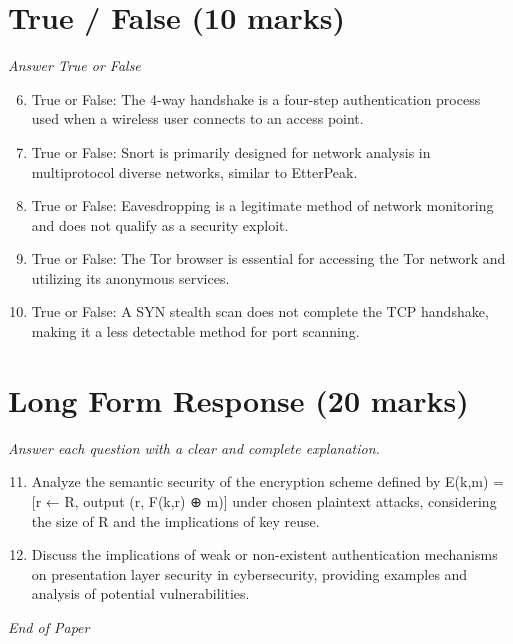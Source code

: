 \documentclass[12pt]{article}
\begin{document}
\section*{True / False (10 marks)}
\textit{Answer True or False}
\begin{enumerate}[label=\arabic*.]
\setcounter{enumi}{5}
\item True or False: The 4-way handshake is a four-step authentication process used when a wireless user connects to an access point.
\item True or False: Snort is primarily designed for network analysis in multiprotocol diverse networks, similar to EtterPeak.
\item True or False: Eavesdropping is a legitimate method of network monitoring and does not qualify as a security exploit.
\item True or False: The Tor browser is essential for accessing the Tor network and utilizing its anonymous services.
\item True or False: A SYN stealth scan does not complete the TCP handshake, making it a less detectable method for port scanning.
\end{enumerate}

\section*{Long Form Response (20 marks)}
\textit{Answer each question with a clear and complete explanation.}
\begin{enumerate}[label=\arabic*.]
\setcounter{enumi}{10}
\item Analyze the semantic security of the encryption scheme defined by E(k,m) = [r ← R, output (r, F(k,r) ⊕ m)] under chosen plaintext attacks, considering the size of R and the implications of key reuse.
\item Discuss the implications of weak or non-existent authentication mechanisms on presentation layer security in cybersecurity, providing examples and analysis of potential vulnerabilities.
\end{enumerate}

\vfill
\noindent\textit{End of Paper}
\end{document}
